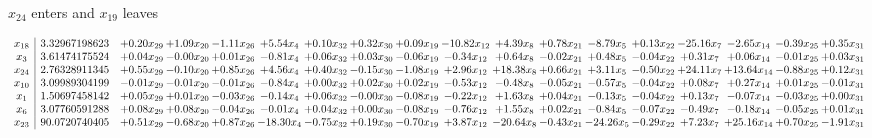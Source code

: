 \documentclass[9pt]{article}
\begin{document}
 $ x_{24} $ enters and $ x_{19} $ leaves 

 \[\begin{array}{c| c c@{\hskip 2pt} c@{\hskip 2pt} c@{\hskip 2pt} c@{\hskip 2pt} c@{\hskip 2pt} c@{\hskip 2pt} c@{\hskip 2pt} c@{\hskip 2pt} c@{\hskip 2pt} c@{\hskip 2pt} c@{\hskip 2pt} c@{\hskip 2pt} c@{\hskip 2pt} c@{\hskip 2pt} c@{\hskip 2pt} c@{\hskip 2pt} }
 x_{18}   &  3.32967198623 & +  0.20 x_{29} & +  1.09 x_{20} & -1.11 x_{26} & +  5.54 x_{4} & +  0.10 x_{32} & +  0.32 x_{30} & +  0.09 x_{19} & -10.82 x_{12} & +  4.39 x_{8} & +  0.78 x_{21} & -8.79 x_{5} & +  0.13 x_{22} & -25.16 x_{7} & -2.65 x_{14} & -0.39 x_{25} & +  0.35 x_{31}\\
 x_{3}   &  3.61474175524 & +  0.04 x_{29} & -0.00 x_{20} & +  0.01 x_{26} & -0.81 x_{4} & +  0.06 x_{32} & +  0.03 x_{30} & -0.06 x_{19} & -0.34 x_{12} & +  0.64 x_{8} & -0.02 x_{21} & +  0.48 x_{5} & -0.04 x_{22} & +  0.31 x_{7} & +  0.06 x_{14} & -0.01 x_{25} & +  0.03 x_{31}\\
 x_{24}   &  2.76328911345 & +  0.55 x_{29} & -0.10 x_{20} & +  0.85 x_{26} & +  4.56 x_{4} & +  0.40 x_{32} & -0.15 x_{30} & -1.08 x_{19} & +  2.96 x_{12} & + 18.38 x_{8} & +  0.66 x_{21} & +  3.11 x_{5} & -0.50 x_{22} & + 24.11 x_{7} & + 13.64 x_{14} & -0.88 x_{25} & +  0.12 x_{31}\\
 x_{10}   &  3.09989304199 & -0.01 x_{29} & -0.01 x_{20} & -0.01 x_{26} & -0.84 x_{4} & +  0.00 x_{32} & +  0.02 x_{30} & +  0.02 x_{19} & -0.53 x_{12} & -0.48 x_{8} & -0.05 x_{21} & -0.57 x_{5} & -0.04 x_{22} & +  0.08 x_{7} & +  0.27 x_{14} & +  0.01 x_{25} & -0.01 x_{31}\\
 x_{1}   &  1.50697458142 & +  0.05 x_{29} & +  0.01 x_{20} & -0.03 x_{26} & -0.14 x_{4} & +  0.06 x_{32} & -0.00 x_{30} & -0.08 x_{19} & -0.22 x_{12} & +  1.63 x_{8} & +  0.04 x_{21} & -0.13 x_{5} & -0.04 x_{22} & +  0.13 x_{7} & -0.07 x_{14} & -0.03 x_{25} & +  0.00 x_{31}\\
 x_{6}   &  3.07760591288 & +  0.08 x_{29} & +  0.08 x_{20} & -0.04 x_{26} & -0.01 x_{4} & +  0.04 x_{32} & +  0.00 x_{30} & -0.08 x_{19} & -0.76 x_{12} & +  1.55 x_{8} & +  0.02 x_{21} & -0.84 x_{5} & -0.07 x_{22} & -0.49 x_{7} & -0.18 x_{14} & -0.05 x_{25} & +  0.01 x_{31}\\
 x_{23}   &  90.0720740405 & +  0.51 x_{29} & -0.68 x_{20} & +  0.87 x_{26} & -18.30 x_{4} & -0.75 x_{32} & +  0.19 x_{30} & -0.70 x_{19} & +  3.87 x_{12} & -20.64 x_{8} & -0.43 x_{21} & -24.26 x_{5} & -0.29 x_{22} & +  7.23 x_{7} & + 25.16 x_{14} & +  0.70 x_{25} & -1.91 x_{31}\\

\end{array}\]
\end{document}
